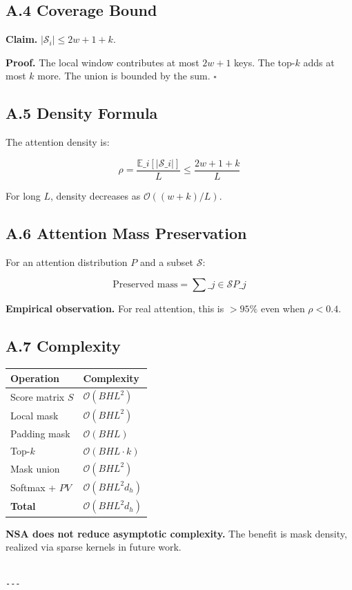 \subsection{A.4 Coverage Bound}

\textbf{Claim.} $|\mathcal{S}_i| \leq 2w + 1 + k$.

\textbf{Proof.} The local window contributes at most $2w + 1$ keys. The top-$k$ 
adds at most $k$ more. The union is bounded by the sum. $\square$

\subsection{A.5 Density Formula}

The attention density is:

\[
\rho = \frac{\mathbb{E}\_i[|\mathcal{S}\_i|]}{L} \leq \frac{2w + 1 + k}{L}
\tag{A.2}
\]

For long $L$, density decreases as $\mathcal{O}((w + k) / L)$.

\subsection{A.6 Attention Mass Preservation}

For an attention distribution $P$ and a subset $\mathcal{S}$:

\[
\text{Preserved mass} = \sum\_{j \in \mathcal{S}} P\_j
\tag{A.3}
\]

\textbf{Empirical observation.} For real attention, this is $> 95\%$ even when 
$\rho < 0.4$.

\subsection{A.7 Complexity}

\begin{table}[H]
\centering
\small
\begin{tabular}{ll}
\toprule
\textbf{Operation} & \textbf{Complexity} \\
\midrule
Score matrix $S$ & $\mathcal{O}(B H L^2)$ \\
Local mask & $\mathcal{O}(B H L^2)$ \\
Padding mask & $\mathcal{O}(B H L)$ \\
Top-$k$ & $\mathcal{O}(B H L \cdot k)$ \\
Mask union & $\mathcal{O}(B H L^2)$ \\
Softmax + $P V$ & $\mathcal{O}(B H L^2 d_h)$ \\
\textbf{Total} & $\mathcal{O}(B H L^2 d_h)$ \\
\bottomrule
\end{tabular}
\end{table}

\textbf{NSA does not reduce asymptotic complexity.} The benefit is mask density, 
realized via sparse kernels in future work.
\begin{lstlisting}

---
\end{lstlisting}